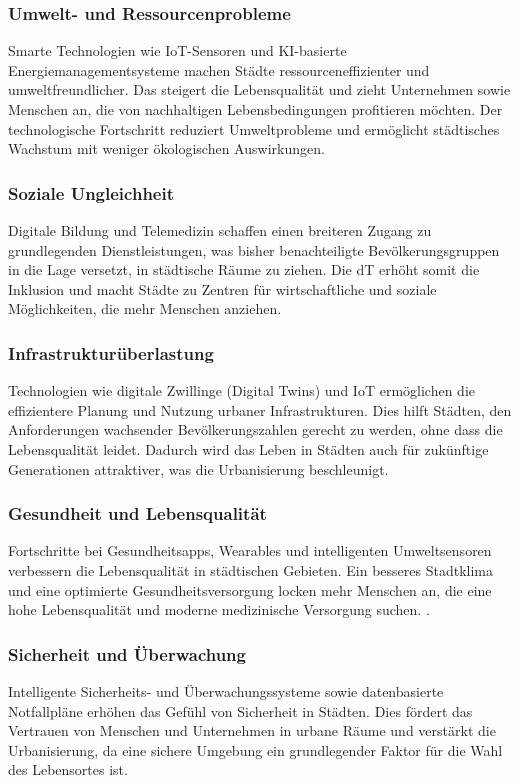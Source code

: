 \documentclass[conference,compsoc,final,a4paper, onecolumn, 11pt]{IEEEtran}
\begin{document}
\subsubsection{Umwelt- und Ressourcenprobleme}
Smarte Technologien wie \ac{IoT}-Sensoren und \ac{KI}-basierte Energiemanagementsysteme machen Städte ressourceneffizienter und umweltfreundlicher. 
Das steigert die Lebensqualität und zieht Unternehmen sowie Menschen an, die von nachhaltigen Lebensbedingungen profitieren möchten. 
Der technologische Fortschritt reduziert Umweltprobleme und ermöglicht städtisches Wachstum mit weniger ökologischen Auswirkungen. \autocite{sensors_smart_2015}

\subsubsection{Soziale Ungleichheit}
Digitale Bildung und Telemedizin schaffen einen breiteren Zugang zu grundlegenden Dienstleistungen, was bisher benachteiligte Bevölkerungsgruppen in die Lage versetzt, in städtische Räume zu ziehen. 
Die \ac{dT} erhöht somit die Inklusion und macht Städte zu Zentren für wirtschaftliche und soziale Möglichkeiten, die mehr Menschen anziehen. \autocite{digital_how_2024}

\subsubsection{Infrastrukturüberlastung}
Technologien wie digitale Zwillinge (Digital Twins) und \ac{IoT} ermöglichen die effizientere Planung und Nutzung urbaner Infrastrukturen. 
Dies hilft Städten, den Anforderungen wachsender Bevölkerungszahlen gerecht zu werden, ohne dass die Lebensqualität leidet. 
Dadurch wird das Leben in Städten auch für zukünftige Generationen attraktiver, was die Urbanisierung beschleunigt. \autocite{mckinsey_global_institute_smart_2021}

\subsubsection{Gesundheit und Lebensqualität}
Fortschritte bei Gesundheitsapps, Wearables und intelligenten Umweltsensoren verbessern die Lebensqualität in städtischen Gebieten. 
Ein besseres Stadtklima und eine optimierte Gesundheitsversorgung locken mehr Menschen an, die eine hohe Lebensqualität und moderne medizinische Versorgung suchen. \autocite{un_habitat_world_2022}.

\subsubsection{Sicherheit und Überwachung}
Intelligente Sicherheits- und Überwachungssysteme sowie datenbasierte Notfallpläne erhöhen das Gefühl von Sicherheit in Städten. 
Dies fördert das Vertrauen von Menschen und Unternehmen in urbane Räume und verstärkt die Urbanisierung, da eine sichere Umgebung ein grundlegender Faktor für die Wahl des Lebensortes ist. \autocite{mckinsey_global_institute_smart_2021}
\end{document}
